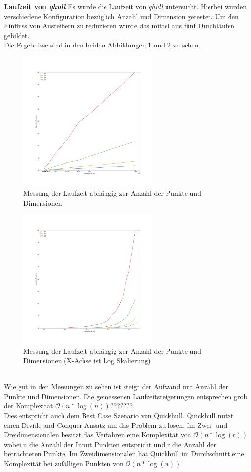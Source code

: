 \documentclass[conference]{IEEEtran}
\begin{document}
	\textbf{Laufzeit von \textit{qhull}}
	Es wurde die Laufzeit von \textit{qhull} untersucht. Hierbei wurden verschiedene Konfiguration bezüglich Anzahl und Dimension getestet. Um den Einfluss von Ausreißern zu reduzieren wurde das mittel aus fünf Durchläufen gebildet.\\
	Die Ergebnisse sind in den beiden Abbildungen \ref{figure_1} und \ref{figure_2} zu sehen.
	\begin{figure}[h]
		\begin{center}
			\includegraphics[width=7cm]{index.png}
			\caption{Messung der Laufzeit abhängig zur Anzahl der Punkte und Dimensionen}
			\label{figure_1}
		\end{center}
	\end{figure}
	\begin{figure}[h]
		\begin{center}
			\includegraphics[width=7cm]{index2.png}
			\caption{Messung der Laufzeit abhängig zur Anzahl der Punkte und Dimensionen (X-Achse ist Log Skalierung)}
			\label{figure_2}
		\end{center}
	\end{figure}\\
	Wie gut in den Messungen zu sehen ist steigt der Aufwand mit Anzahl der Punkte und Dimensionen.
	Die gemessenen Laufzeitsteigerungen entsprechen grob der Komplexität $\mathcal{O}(n * \log(n))$???????.\\
	Dies entspricht auch dem Best Case Szenario von Quickhull. 
	Quickhull nutzt einen Divide and Conquer Ansatz um das Problem zu lösen. Im Zwei- und Dreidimensionalen besitzt das Verfahren eine Komplexität von $\mathcal{O}(n * \log(r))$ wobei n die Anzahl der Input Punkten entspricht und r die Anzahl der betrachteten Punkte.
	Im Zweidimensionalen hat Quickhull im Durchschnitt eine Komplexität bei zufälligen Punkten von $\mathcal{O}(n * \log(n))$.\\
\end{document}
